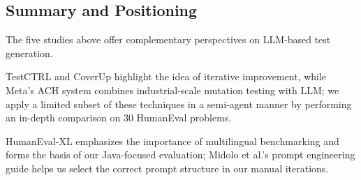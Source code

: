 \subsection{Summary and Positioning}

The five studies above offer complementary perspectives on LLM-based test generation.

TestCTRL and CoverUp highlight the idea of iterative improvement, while Meta's ACH system combines industrial-scale mutation testing with LLM; we apply a limited subset of these techniques in a semi-agent manner by performing an in-depth comparison on 30 HumanEval problems.

HumanEval-XL emphasizes the importance of multilingual benchmarking and forms the basis of our Java-focused evaluation; Midolo et al.'s prompt engineering guide helps us select the correct prompt structure in our manual iterations.
